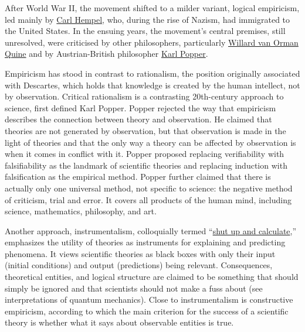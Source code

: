 \documentclass[
]{article}
\begin{document}
After World War II, the movement shifted to a milder variant, logical
empiricism, led mainly by
\href{https://en.wikipedia.org/wiki/Carl_Gustav_Hempel}{Carl Hempel},
who, during the rise of Nazism, had immigrated to the United States. In
the ensuing years, the movement's central premises, still unresolved,
were criticised by other philosophers, particularly
\href{https://en.wikipedia.org/wiki/Willard_Van_Orman_Quine}{Willard van
Orman Quine} and by Austrian-British philosopher
\href{https://en.wikipedia.org/wiki/Karl_Popper}{Karl Popper}.

Empiricism has stood in contrast to rationalism, the position originally
associated with Descartes, which holds that knowledge is created by the
human intellect, not by observation. Critical rationalism is a
contrasting 20th-century approach to science, first defined Karl Popper.
Popper rejected the way that empiricism describes the connection between
theory and observation. He claimed that theories are not generated by
observation, but that observation is made in the light of theories and
that the only way a theory can be affected by observation is when it
comes in conflict with it. Popper proposed replacing verifiability with
falsifiability as the landmark of scientific theories and replacing
induction with falsification as the empirical method. Popper further
claimed that there is actually only one universal method, not specific
to science: the negative method of criticism, trial and error. It covers
all products of the human mind, including science, mathematics,
philosophy, and art.

Another approach, instrumentalism, colloquially termed
``\href{https://physicstoday.scitation.org/doi/10.1063/1.1768652}{shut
up and calculate},'' emphasizes the utility of theories as instruments
for explaining and predicting phenomena. It views scientific theories as
black boxes with only their input (initial conditions) and output
(predictions) being relevant. Consequences, theoretical entities, and
logical structure are claimed to be something that should simply be
ignored and that scientists should not make a fuss about (see
interpretations of quantum mechanics). Close to instrumentalism is
constructive empiricism, according to which the main criterion for the
success of a scientific theory is whether what it says about observable
entities is true.
\end{document}
